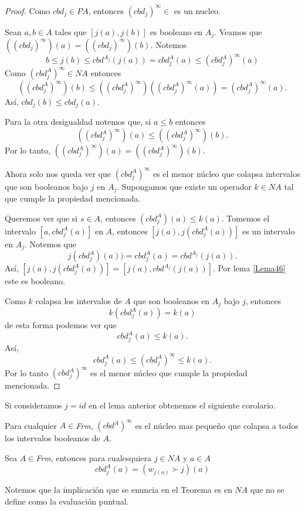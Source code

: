 \begin{proof}
Como $cbd_j\in PA$, entonces $(cbd_j)^\infty\in$ es un nucleo.

\noindent
Sean $a,b\in A$ tales que $[j(a),j(b)]$ es booleano en $A_j$. Veamos que $((cbd_j)^\infty )(a)= ((cbd_j)^\infty )(b)$. Notemos $$b\leq j(b)\leq cbd^{A_j}(j(a))=cbd_j^A(a)\leq (cbd_j^A)^\infty (a)$$
Como $(cbd_j^A)^\infty\in NA$ entonces 
$$((cbd_j^A)^\infty )(b)\leq ((cbd_j^A)^\infty)((cbd_j^A)^\infty (a))= (cbd_j^A)^\infty (a).$$ 
Así, $cbd_j(b)\leq cbd_j(a)$.

\noindent
Para la otra desigualdad notemos que,
si $a\leq b$ entonces
\[
  ((cbd_j^A)^\infty )(a)\leq ((cbd_j^A)^\infty )(b)
.\]
Por lo tanto, $((cbd_j^A)^\infty )(a)= ((cbd_j^A)^\infty )(b)$.

\noindent
Ahora solo nos queda ver que $(cbd_j^A)^\infty$ es el menor núcleo que colapsa intervalos que son booleanos bajo $j$ en $A_j$. Supongamos que existe un operador $k\in NA$ tal que cumple la propiedad mencionada.

\noindent
Queremos ver que si $s\in A$, entonces $(cbd_j^A)(a)\leq k(a)$. Tomemos el intervalo $[a,cbd_j^A(a)]$ en $A$, entonces $[j(a),j(cbd_j^A(a))]$ es un intervalo en $A_j$. Notemos que $$j(cbd_j^A)(a))=cbd_j^A(a)=cbd^{A_j}(j(a)).$$ 
Así, $[j(a), j(cbd_j^A(a))]=[j(a),cbd^{A_j}(j(a))]$. Por lema \ref{Lema46} este es booleano.

\noindent
Como $k$ colapsa los intervalos de $A$ que son booleanos en $A_j$ bajo $j$, entonces $$k(cbd_j^A(a))=k(a)$$
de esta forma podemos ver que $$cbd_j^A(a)\leq k(a).$$ 
Así, $$cbd_j^A(a)\leq (cbd_j^A)^\infty\leq k(a).$$
Por lo tanto $(cbd_j^A)^\infty$ es el menor núcleo que cumple la propiedad mencionada.
\end{proof}

Si consideramos $j=id$ en el lema anterior obtenemos el siguiente corolario.

\begin{cor}
Para cualquier $A\in$\textit{Frm}, $(cbd^A)^\infty$ es el núcleo mas pequeño que colapsa a todos los intervalos booleanos de $A$.
\end{cor}

\begin{thm}
Sea $A\in$\textit{Frm}, entonces para cualesquiera $j\in NA$ y $a\in A$ $$cbd_j^A(a)=(w_{j(a)}\succ j)(a)$$
\end{thm}
Notemos que la implicación que se enuncia en el Teorema es en $NA$ que no se define como la evaluación puntual.

